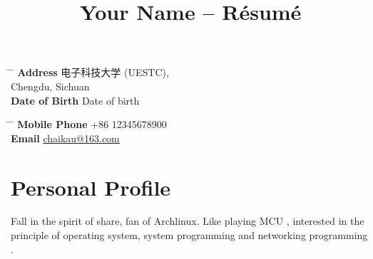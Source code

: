 \documentclass[10pt]{article} %
\begin{document}

\title{{\song Your Name} -- Résumé} %


\parbox{0.5\textwidth}{ %
\begin{tabbing} %
\hspace{3cm} \= \hspace{4cm} \= \kill %
{\bf Address} \> {\song 电子科技大学} (UESTC), \\ %
\> Chengdu, Sichuan \\ %
{\bf Date of Birth} \> Date of birth \\ %
\end{tabbing}}
\hfill %
\parbox{0.5\textwidth}{ %
\begin{tabbing} %
\hspace{3cm} \= \hspace{4cm} \= \kill %
{\bf Mobile Phone} \> +86 12345678900\\ %
{\bf Email} \> \href{mailto:chaikau@163.com}{chaikau@163.com} \\ %
\end{tabbing}}


\section{Personal Profile}
Fall in the spirit of share, fan of Archlinux. Like playing MCU , interested in the principle of operating system, system programming and networking programming . 
\end{document}
